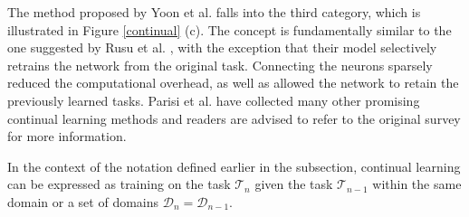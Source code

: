 The method proposed by Yoon et al. \cite{Yoon2017} falls into the third category, which is illustrated in Figure \ref{continual} (c). The concept is fundamentally similar to the one suggested by Rusu et al. \cite{Rusu2016}, with the exception that their model selectively retrains the network from the original task. Connecting the neurons sparsely reduced the computational overhead, as well as allowed the network to retain the previously learned tasks. Parisi et al. \cite{Parisi2018} have collected many other promising continual learning methods and readers are advised to refer to the original survey for more information.   

In the context of the notation defined earlier in the  subsection, continual learning can be expressed as training on the task $\mathcal{T}_n$ given the task $\mathcal{T}_{n-1}$ within the same domain or a set of domains $\mathcal{D}_{n} = \mathcal{D}_{n-1}$.   

\FloatBarrier

\clearpage 